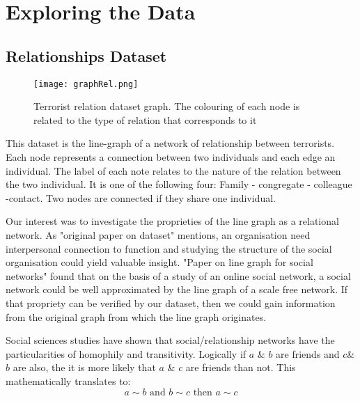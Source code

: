 \section{Exploring the Data}
\label{sec:Exploring the Data}

\subsection{Relationships Dataset}
\label{subsec:Relationships Dataset}

\begin{figure}[H]
\begin{center}

        \texttt{[image: graphRel.png]}
        \label{fig:graphLoc}
        \caption{Terrorist relation dataset graph. The colouring of each node is related to the type of relation that corresponds to it}
        
\end{center}
\end{figure}


This dataset is the line-graph of a network of relationship between terrorists. Each node represents a connection between two individuals and each edge an individual. 
The label of each note relates to the nature of the relation between the two individual. It is one of the following four: 
Family - congregate - colleague -contact.
Two nodes are connected if they share one individual.

Our interest was to investigate the proprieties of the line graph as a relational network. As "original paper on dataset" mentions, an organisation need interpersonal connection to function and studying the structure of the social organisation could yield valuable insight.
"Paper on line graph for social networks" found that on the basis of a study of an online social network, a social network could be well approximated by the line graph of a scale free network. If that propriety can be verified by our dataset, then we could gain information from the original graph from which the line graph originates.

\label{subsec:Proprieties of the graphs}
Social sciences studies have shown that social/relationship networks have the particularities of homophily and transitivity.
Logically if $a$ \& $b$ are friends and $c$\& $b$ are also, the it is more likely that $a$ \& $c$ are friends than not. This mathematically translates to:
\begin{equation}
	a \sim b \text{ and } b \sim c \text{ then } a \sim c
\end{equation}

